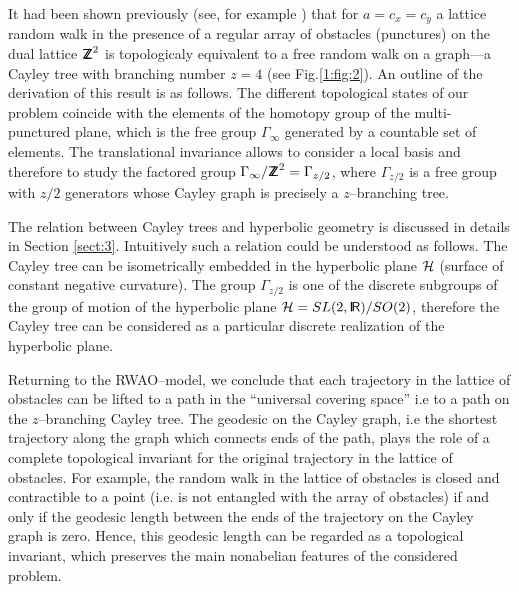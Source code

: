 It had been shown previously (see, for example \cite{ne_kh_sem,khter}) that for
$a=c_x=c_y$ a lattice random walk in the presence of a  regular array of obstacles (punctures) on the
dual lattice ${{\sf Z\kern-.45em Z}}^2$ is topologicaly equivalent to a  free random walk on a graph---a
Cayley tree with branching number $z=4$ (see Fig.\ref{1:fig:2}). An
outline of the derivation of this result is as follows. The different topological states of our problem coincide with the elements of the homotopy group of the multi-punctured plane, which is the free group $\Gamma_{\infty}$ generated by  a countable set of elements. The translational invariance allows to consider a local basis and therefore to study the factored group $\Gamma_{\infty}/{{\sf Z\kern-.45em Z}}^2=\Gamma_{z/2}$, where $\Gamma_{z/2}$ is a free group with $z/2$ generators whose Cayley graph is precisely a $z$--branching tree.




The relation between  Cayley trees and hyperbolic geometry is
discussed in details in Section \ref{sect:3}. Intuitively 
such a relation could be understood as follows. The Cayley tree can be
isometrically embedded in the hyperbolic plane ${\cal H}$ (surface of
constant negative curvature). The group $\Gamma_{z/2}$ is one of the discrete
subgroups of the group of motion of the hyperbolic plane ${\cal H}=SL(2,{{\sf I\kern-.15em R}})/SO(2)$, therefore the Cayley tree can be considered as a particular discrete realization of the hyperbolic plane.

Returning to the RWAO--model, we conclude that each trajectory in the lattice
of obstacles can be lifted to a path in the ``universal covering space'' i.e to
a path on the $z$--branching Cayley tree. The geodesic on the Cayley graph, i.e the shortest trajectory along the graph which connects ends of the path, plays the
role of a complete topological invariant for the original trajectory in the
lattice of obstacles. For example, the random walk in the lattice of obstacles
is closed and contractible to a point (i.e. is not entangled with
the array of obstacles) if and only if the geodesic length between the ends of
the trajectory on the Cayley graph is zero. Hence, this geodesic length can be regarded as a topological invariant, which preserves the main  nonabelian features of the considered problem.

